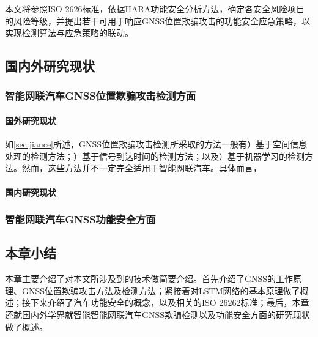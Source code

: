 本文将参照ISO 2626标准，依据HARA功能安全分析方法，确定各安全风险项目的风险等级，并提出若干可用于响应GNSS位置欺骗攻击的功能安全应急策略，以实现检测算法与应急策略的联动。

\subsection{国内外研究现状}
\subsubsection{智能网联汽车GNSS位置欺骗攻击检测方面}
\paragraph{国外研究现状}
\label{国外研究现状GNSS_guowai}
如\ref{sec:jiance}所述，GNSS位置欺骗攻击检测所采取的方法一般有）基于空间信息处理的检测方法；）基于信号到达时间的检测方法；以及）基于机器学习的检测方法。然而，这些方法并不一定完全适用于智能网联汽车。具体而言，

\paragraph{国内研究现状}
\label{GNSS_guonei}

\subsubsection{智能网联汽车GNSS功能安全方面}
\subsection{本章小结}
本章主要介绍了对本文所涉及到的技术做简要介绍。首先介绍了GNSS的工作原理、GNSS位置欺骗攻击方法及检测方法；紧接着对LSTM网络的基本原理做了概述；接下来介绍了汽车功能安全的概念，以及相关的ISO 26262标准；最后，本章还就国内外学界就智能智能网联汽车GNSS欺骗检测以及功能安全方面的研究现状做了概述。
